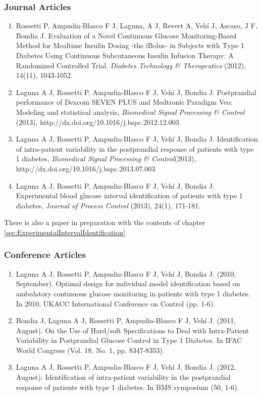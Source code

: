 \subsubsection*{Journal Articles}
\begin{enumerate}
	\item Rossetti P, Ampudia-Blasco F J, Laguna, A J, Revert A, Veh\'{i} J, Ascaso, J F, Bondia J. Evaluation of a Novel Continuous Glucose Monitoring-Based Method for Mealtime Insulin Dosing -the iBolus- in Subjects with Type 1 Diabetes Using Continuous Subcutaneous Insulin Infusion Therapy: A Randomized Controlled Trial. \textit{Diabetes Technology \& Therapeutics} (2012), 14(11), 1043-1052.
  \item Laguna A J, Rossetti P, Ampudia-Blasco F J, Veh\'{i} J, Bondia J. Postprandial performance of Dexcom\textsuperscript{\textregistered} SEVEN\textsuperscript{\textregistered} PLUS and Medtronic\textsuperscript{\textregistered} Paradigm\textsuperscript{\textregistered} Veo\texttrademark{}: Modeling and statistical analysis, \textit{Biomedical Signal Processing \& Control} (2013), http://dx.doi.org/10.1016/j.bspc.2012.12.003
  \item Laguna A J, Rossetti P, Ampudia-Blasco F J, Veh\'{i} J, Bondia J. Identification of intra-patient variability in the postprandial response of patients with type 1 diabetes, \textit{Biomedical Signal Processing \& Control}(2013), http://dx.doi.org/10.1016/j.bspc.2013.07.003
  \item Laguna A J, Rossetti P, Ampudia-Blasco F J, Veh\'{i} J, Bondia J. Experimental blood glucose interval identification of patients with type 1 diabetes, \textit{Journal of Process Control} (2013), 24(1), 171-181.
\end{enumerate}
There is also a paper in preparation with the contents of chapter \ref{sec:ExperimentalIntervalIdentification}.

\subsubsection*{Conference Articles}
\begin{enumerate}
	\item Laguna A J, Rossetti P, Ampudia-Blasco F J, Veh\'{i} J, Bondia J. (2010, September). Optimal design for individual model identification based on ambulatory continuous glucose monitoring in patients with type 1 diabetes. In 2010, UKACC International Conference on Control (pp. 1-6).
	\item Bondia J, Laguna A J, Rossetti P, Ampudia-Blasco F J, Veh\'{i} J. (2011, August). On the Use of Hard/soft Specifications to Deal with Intra-Patient Variability in Postprandial Glucose Control in Type 1 Diabetes. In IFAC World Congress (Vol. 18, No. 1, pp. 8347-8353).
	\item Laguna A J, Rossetti P, Ampudia-Blasco F J, Veh\'{i} J, Bondia J. (2012, August). Identification of intra-patient variability in the postprandial response of patients with type 1 diabetes. In BMS symposium (50, 1-6).
\end{enumerate}

